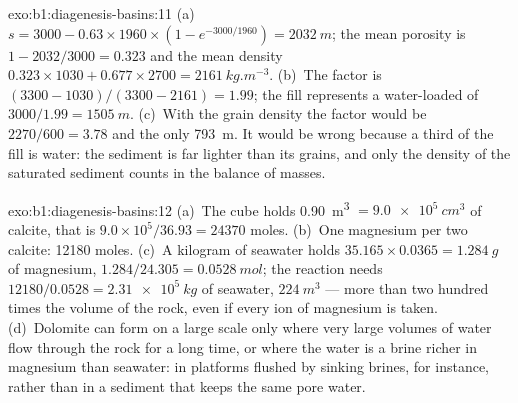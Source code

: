 \begin{solution}{exo:b1:diagenesis-basins:11}
(a)~$s = 3000 - 0.63\times1960\times(1 - e^{-3000/1960}) = \qty{2032}{m}$; the
mean porosity is $1 - 2032/3000 = \num{0.323}$ and the mean density
$0.323\times1030 + 0.677\times2700 = \qty{2161}{kg.m^{-3}}$. (b)~The factor is
$(3300 - 1030)/(3300 - 2161) = \num{1.99}$; the fill represents a water-loaded
 of $3000/1.99 = \qty{1505}{m}$. (c)~With the grain density the factor
would be $2270/600 = \num{3.78}$ and the  only \qty{793}{m}. It would be
wrong because a third of the fill is water: the sediment is far lighter than its
grains, and only the density of the saturated sediment counts in the balance of
masses.
\end{solution}

\begin{solution}{exo:b1:diagenesis-basins:12}
(a)~The cube holds \qty{0.90}{m^3} $= \qty{9.0e5}{cm^3}$ of calcite, that is
$9.0\times10^5/36.93 = \num{24370}$ moles. (b)~One magnesium per two calcite:
\num{12180} moles. (c)~A kilogram of seawater holds $35.165\times0.0365 =
\qty{1.284}{g}$ of magnesium, $1.284/24.305 = \qty{0.0528}{mol}$; the reaction
needs $12180/0.0528 = \qty{2.31e5}{kg}$ of seawater, $\qty{224}{m^3}$ --- more
than two hundred times the volume of the rock, even if every ion of magnesium is
taken. (d)~Dolomite can form on a large scale only where very large volumes of
water flow through the rock for a long time, or where the water is a brine
richer in magnesium than seawater: in platforms flushed by sinking brines, for
instance, rather than in a sediment that keeps the same pore water.
\end{solution}

